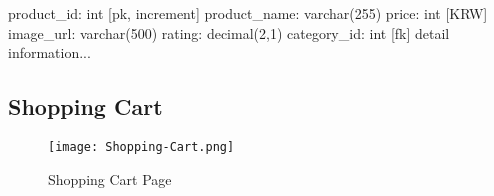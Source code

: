 \documentclass[conference]{IEEEtran}
\begin{document}
\begin{enumerate}
product\_id: int [pk, increment] \newline\hspace*{1.2ex}
product\_name: varchar(255) \newline\hspace*{1.2ex}
price: int [KRW] \newline\hspace*{1.2ex}
image\_url: varchar(500) \newline\hspace*{1.2ex}
rating: decimal(2,1) \newline\hspace*{1.2ex}
category\_id: int [fk] \newline\hspace*{1.2ex}
detail information...

\hspace{0.5em}{\scriptsize Table attribute can be changed in development.}
\end{enumerate}


\subsection{Shopping Cart}

\begin{figure}[H]
    \centering
    \texttt{[image: Shopping-Cart.png]}
    \caption{Shopping Cart Page}
    \label{fig:Shopping Cart Page}
\end{figure}
\end{document}
